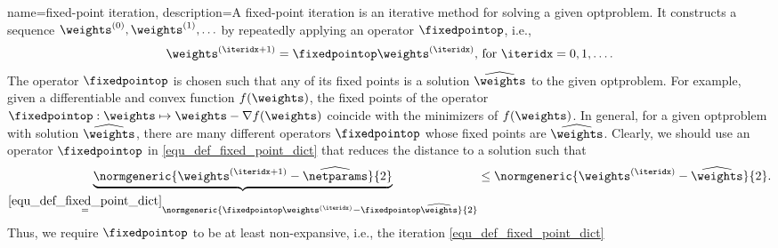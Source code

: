 

{name={fixed-point iteration},
	description={A fixed-point iteration is an iterative method for solving 
		a given \gls{optproblem}. It constructs a sequence $\weights^{(0)}, \weights^{(1)}, \ldots$ by 
		 repeatedly applying an operator $\fixedpointop$, i.e., 
		 \begin{equation} 
		 	\label{equ_def_fixed_point_dict} 
		 	\weights^{(\iteridx+1)} = \fixedpointop \weights^{(\iteridx)} \mbox{, for } \iteridx=0, 1, \ldots.
		 \end{equation} 
		 The operator $\fixedpointop$ is chosen such that any of its fixed points is a solution 
		 $\widehat{\weights}$ to the given \gls{optproblem}. For example, given a \gls{differentiable} and 
		 \gls{convex} \gls{function} $f(\weights)$, the fixed points of the operator $\fixedpointop: \weights \mapsto \weights - \nabla f(\weights)$ 
		 coincide with the minimizers of $f(\weights)$. In general, for a given \gls{optproblem} with solution $\widehat{\weights}$, 
		 there are many different operators $\fixedpointop$ whose fixed points are $\widehat{\weights}$. 
		 Clearly, we should use an operator $\fixedpointop$ in \eqref{equ_def_fixed_point_dict} that reduces the distance to a solution such that
		 \begin{equation} 
			\nonumber
			\underbrace{\normgeneric{ \weights^{(\iteridx+1)} - \widehat{\netparams}}{2}}_{\stackrel{\eqref{equ_def_fixed_point_dict}}{=} \normgeneric{ \fixedpointop \weights^{(\iteridx)} - \fixedpointop\widehat{\weights}}{2}}  \leq 	\normgeneric{ \weights^{(\iteridx)} - \widehat{\weights}}{2}. 
		\end{equation}
		Thus, we require $\fixedpointop$ to be at least non-expansive, i.e., the iteration \eqref{equ_def_fixed_point_dict} 
}}
